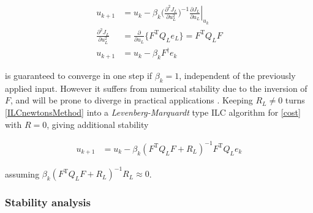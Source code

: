 \documentclass[10pt,a4paper]{article}
\newcommand\at[2]{\left.#1\right|_{#2}} %
\newcommand{\todo}{\textcolor{red}{TODO}} %
\newcommand{\error}{e} %
\newcommand{\sysInput}{u} %
\newcommand{\ValueFunction}{J}
\begin{document}
\begin{equation}
\begin{aligned}
\sysInput_{k+1} &= \sysInput_k - \beta_k\Big(\frac{\partial^{2}\ValueFunction_L}{\partial\sysInput^{2}_L}\Big)^{-1}\at{\frac{\partial{\ValueFunction_L}}{\partial{\sysInput_L}}}{\sysInput_k} \\
\frac{\partial^{2}\ValueFunction_L}{\partial\sysInput^{2}_L} &= \frac{\partial}{\partial\sysInput_L}\{F^{\mathrm{T}}Q_L\error_L\} = F^{\mathrm{T}}Q_LF \\
\sysInput_{k+1} &= \sysInput_k - \beta_kF^{\dagger}\error_k
\end{aligned}
\label{ILCnewtonsMethod}
\end{equation}

\noindent is guaranteed to converge in one step if $\beta_k = 1$, independent of the previously applied input. However it suffers from numerical stability due to the inversion of $F$, and will be prone to diverge in practical applications \cite{Bristow06}. Keeping $R_L \neq 0$ turns \eqref{ILCnewtonsMethod} into a \emph{Levenberg-Marquardt} \cite{Nocedal99} type ILC algorithm for \eqref{cost} with $R = 0$, giving additional stability

\begin{equation}
\begin{aligned}
\sysInput_{k+1} &= \sysInput_k - \beta_k(F^{\mathrm{T}}Q_LF + R_L)^{-1}F^{\mathrm{T}}Q_L\error_k
\end{aligned}
\label{ILClevenbergMarquardt}
\end{equation}

\noindent assuming $\beta_k(F^{\mathrm{T}}Q_LF + R_L)^{-1}R_L \approx 0$.


\subsubsection{Stability analysis}
\end{document}
